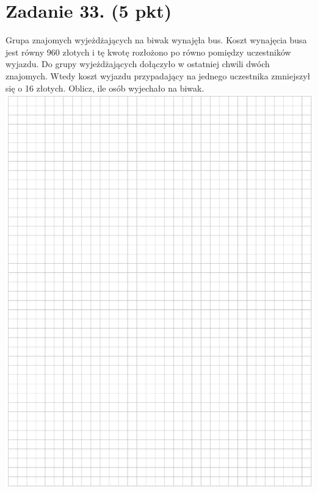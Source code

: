 \documentclass[10pt]{article}
\begin{document}
\section*{Zadanie 33. (5 pkt)}
Grupa znajomych wyjeżdżających na biwak wynajęła bus. Koszt wynajęcia busa jest równy 960 złotych i tę kwotę rozłożono po równo pomiędzy uczestników wyjazdu. Do grupy wyjeżdżających dołączyło w ostatniej chwili dwóch znajomych. Wtedy koszt wyjazdu przypadający na jednego uczestnika zmniejszył się o 16 złotych. Oblicz, ile osób wyjechało na biwak.\\
\includegraphics[max width=\textwidth, center]{2024_11_21_779b7f825da3a12753feg-20}\\
\end{document}
